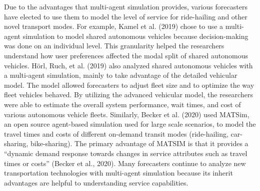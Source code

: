 \documentclass[fancy, masters]{byuthesis}
\begin{document}
Due to the advantages that multi-agent simulation provides, various forecasters have elected to use them to model the level of service for ride-hailing and other novel transport modes. For example, Kamel et al. (2019) chose to use a multi-agent simulation to model shared autonomous vehicles because decision-making was done on an individual level. This granularity helped the researchers understand how user preferences affected the modal split of shared autonomous vehicles. Hörl, Ruch, et al. (2019) also analyzed shared autonomous vehicles with a multi-agent simulation, mainly to take advantage of the detailed vehicular model. The model allowed forecasters to adjust fleet size and to optimize the way fleet vehicles behaved. By utilizing the advanced vehicular model, the researchers were able to estimate the overall system performance, wait times, and cost of various autonomous vehicle fleets. Similarly, Becker et al. (2020) used MATSim, an open source agent-based simulation used for large scale scenarios, to model the travel times and costs of different on-demand transit modes (ride-hailing, car-sharing, bike-sharing). The primary advantage of MATSIM is that it provides a ``dynamic demand response towards changes in service attributes such as travel times or costs'' (Becker et al., 2020). Many forecasters continue to analyze new transportation technologies with multi-agent simulation because its inherit advantages are helpful to understanding service capabilities.
\end{document}
